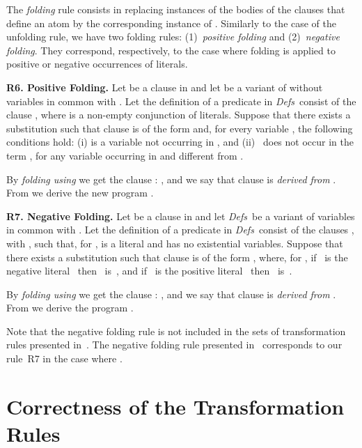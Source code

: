 \documentclass[english]{tlp}
\newcommand{\Mathit}[1]{\mbox{\it #1}}
\newcommand{\DefsPrk}{\Mathit{Defs}}
\begin{document}
\medskip

\noindent The \emph{folding} rule consists in replacing instances of
the bodies of the clauses that define an atom  by the
corresponding instance of . Similarly to the case of the
unfolding rule, we have two folding rules: (1)~\emph{positive folding}
and (2)~\emph{negative folding}. They correspond, respectively, to the
case where folding is applied to positive or negative occurrences of
literals.

\smallskip{}

\noindent \textbf{R6. Positive Folding.} Let  be a clause in
 and let  be a variant of
 without variables in common with . Let the
definition of a predicate in \DefsPrk~consist of the clause , where  is a non-empty conjunction of literals.
Suppose that there exists a substitution  such that
clause  is of the form  and, for every variable , the following conditions hold: (i)  is a variable not occurring in , and (ii)~ does not occur in the term , for any variable  occurring in  and
different from .

\noindent By \emph{folding  using } we get the
clause : , and we say that clause   is {\it{derived from}}
. From  we derive the new program .

\medskip{}

\noindent \textbf{R7. Negative Folding.} Let  be a clause in
 and let \DefsPrk~be a variant of \Defskwithout
variables in common with . Let the definition of a predicate
in \DefsPrk~consist of the  clauses , with , such that, for
,  is a literal and  
has no existential variables. Suppose that there exists a
substitution  such that clause  is of the
form , where, for , if~ is the negative
literal~ then~ is~, and if~ is the
positive literal~ then~ is~.

\noindent By \emph{folding  using
} we get the clause : , and we
say that clause   is {\it{derived from}} . From  we derive the program .

\medskip

Note that the negative folding 
rule is not included in the sets of transformation rules
presented in~\cite{Ro&02,Sek91,Sek09}.
The negative folding rule presented in~\cite{Fi&04a,PeP00a} corresponds 
to our rule~R7 in the case where . 



\section{Correctness of the Transformation Rules}
\label{sec:corr_of_rules}
\end{document}
